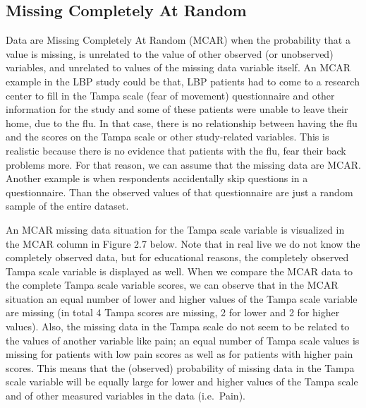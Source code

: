 \documentclass[]{book}
\begin{document}
\subsection{Missing Completely At
Random}\label{missing-completely-at-random}

Data are Missing Completely At Random (MCAR) when the probability that a
value is missing, is unrelated to the value of other observed (or
unobserved) variables, and unrelated to values of the missing data
variable itself. An MCAR example in the LBP study could be that, LBP
patients had to come to a research center to fill in the Tampa scale
(fear of movement) questionnaire and other information for the study and
some of these patients were unable to leave their home, due to the flu.
In that case, there is no relationship between having the flu and the
scores on the Tampa scale or other study-related variables. This is
realistic because there is no evidence that patients with the flu, fear
their back problems more. For that reason, we can assume that the
missing data are MCAR. Another example is when respondents accidentally
skip questions in a questionnaire. Than the observed values of that
questionnaire are just a random sample of the entire dataset.

An MCAR missing data situation for the Tampa scale variable is
visualized in the MCAR column in Figure 2.7 below. Note that in real
live we do not know the completely observed data, but for educational
reasons, the completely observed Tampa scale variable is displayed as
well. When we compare the MCAR data to the complete Tampa scale variable
scores, we can observe that in the MCAR situation an equal number of
lower and higher values of the Tampa scale variable are missing (in
total 4 Tampa scores are missing, 2 for lower and 2 for higher values).
Also, the missing data in the Tampa scale do not seem to be related to
the values of another variable like pain; an equal number of Tampa scale
values is missing for patients with low pain scores as well as for
patients with higher pain scores. This means that the (observed)
probability of missing data in the Tampa scale variable will be equally
large for lower and higher values of the Tampa scale and of other
measured variables in the data (i.e.~Pain).
\end{document}
